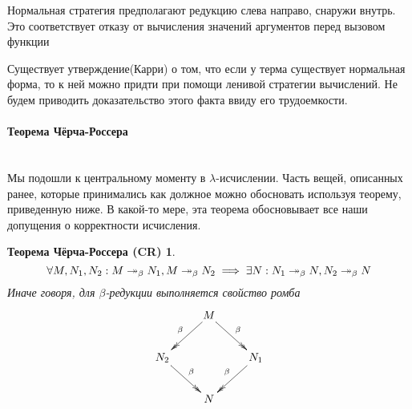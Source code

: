 \documentclass[lambda.tex]{subfiles}
\begin{document}
Нормальная стратегия предполагают редукцию слева направо, снаружи внутрь. Это соответствует отказу от вычисления значений аргументов перед вызовом функции

Существует утверждение(Карри) о том, что если у терма существует нормальная форма, то к ней можно придти при помощи ленивой стратегии вычислений. Не будем приводить доказательство этого факта ввиду его трудоемкости. 

\begin{tcolorbox}
	\paragraph{Теорема Чёрча-Россера} %
	\label{par:Church-Rosser}~\\
	Мы подошли к центральному моменту в $\lambda$-исчислении. Часть вещей, описанных ранее, которые принимались как должное можно обосновать используя теорему, приведенную ниже. В какой-то мере, эта теорема обосновывает все наши допущения о корректности исчисления.
	\newtheorem*{churchrosser}{Теорема Чёрча-Россера (CR)}
	\begin{churchrosser}
		$$
		\forall M,N_1,N_2:M
		\twoheadrightarrow_\beta N_1, M
		\twoheadrightarrow_\beta N_2
		\implies
		\exists N : N_1
		\twoheadrightarrow_\beta N,N_2
		\twoheadrightarrow_\beta N
		$$
		Иначе говоря, для $\beta$-редукции выполняется свойство ромба
		\begin{align*}
			\xymatrix{
			& \ar@{->>}[dl]_\beta M \ar@{->>}[dr]^\beta \\
			N_2 \ar@{->>}[dr]^\beta & & N_1 \ar@{->>}[dl]_\beta \\
			&N
		}
		\end{align*}
	\end{churchrosser}



\end{tcolorbox}
\end{document}

